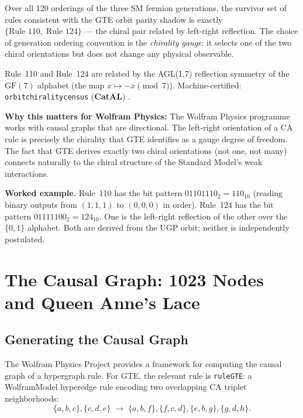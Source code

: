 \documentclass[11pt,a4paper]{article}
\newcommand{\lean}[1]{%
  \penalty-100
  \begingroup\def\_{\textunderscore\allowbreak}\texttt{#1}\endgroup}
\newcommand{\CatAL}{\textbf{CatAL}}
\begin{document}
\begin{tcolorbox}[colback=boxpurple,colframe=blue!40!black,
  title={Chirality Census Theorem (\CatAL)}]
Over all 120 orderings of the three SM fermion generations, the survivor set
of rules consistent with the GTE orbit parity shadow is exactly
$\{\text{Rule~110},\; \text{Rule~124}\}$ — the chiral pair related by
left-right reflection.  The choice of generation ordering convention is the
\emph{chirality gauge}: it selects one of the two chiral orientations but does
not change any physical observable.
\end{tcolorbox}

Rule~110 and Rule~124 are related by the AGL(1,7) reflection symmetry of the
$\mathrm{GF}(7)$ alphabet (the map $x \mapsto -x \pmod{7}$).  Machine-certified:
\lean{orbit\_chirality\_census} (\CatAL) \cite{SpivackGTECompleteFramework}.

\textbf{Why this matters for Wolfram Physics:} The Wolfram Physics programme
works with causal graphs that are directional.  The left-right orientation of
a CA rule is precisely the chirality that GTE identifies as a gauge degree of
freedom.  The fact that GTE derives exactly two chiral orientations (not one,
not many) connects naturally to the chiral structure of the Standard Model's
weak interactions.

\textbf{Worked example.}  Rule~110 has the bit pattern $01101110_2 = 110_{10}$
(reading binary outputs from $(1,1,1)$ to $(0,0,0)$ in order).  Rule~124 has
the bit pattern $01111100_2 = 124_{10}$.  One is the left-right reflection of
the other over the $\{0,1\}$ alphabet.  Both are derived from the UGP orbit;
neither is independently postulated.

\section{The Causal Graph: 1023 Nodes and Queen Anne's Lace}
\label{sec:causal}

\subsection{Generating the Causal Graph}

The Wolfram Physics Project provides a framework for computing the causal graph
of a hypergraph rule.  For GTE, the relevant rule is \texttt{ruleGTE}: a
WolframModel hyperedge rule encoding two overlapping CA triplet neighborhoods:
\begin{equation}
  \{a,b,c\},\{c,d,e\} \;\to\; \{a,b,f\},\{f,c,d\},\{e,b,g\},\{g,d,h\}.
  \label{eq:rulegte}
\end{equation}
\end{document}
